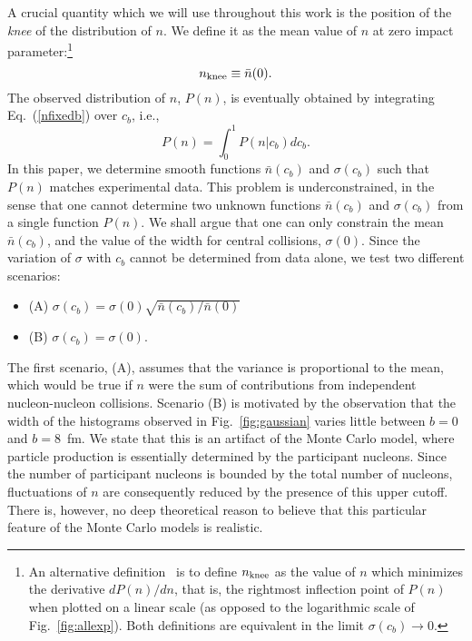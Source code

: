 \documentclass[aps,prc,twocolumn,superscriptaddress,showpacs,floatfix,nofootinbib]{revtex4-1}
\begin{document}
A crucial quantity which we will use throughout this work is the position of the \textit{knee} of the distribution of $n$. 
We define it as the mean value of $n$ at zero impact parameter:\footnote{An alternative definition~\cite{ATLAS:2017zcm} is to define $n_{\rm knee}$ as the value of $n$ which minimizes the derivative $dP(n)/dn$, that is, the rightmost inflection point of $P(n)$ when plotted on a linear scale (as opposed to the logarithmic scale of Fig.~\ref{fig:allexp}). Both definitions are equivalent in the limit $\sigma(c_b)\to 0$.}
\begin{equation}
\label{defknee}
n_{\rm knee}\equiv \bar n(0).
\end{equation}
The observed distribution of $n$, $P(n)$, is eventually obtained by integrating Eq.~(\ref{nfixedb}) over $c_b$, i.e.,
\begin{equation}
\label{vzerodist}
P(n)=\int_0^1 P(n|c_b)dc_b. 
\end{equation}
In this paper, we determine smooth functions $\bar n(c_b)$ and $\sigma(c_b)$ such that $P(n)$ matches experimental data. 
This problem is underconstrained, in the sense that one cannot determine two unknown functions $\bar n(c_b)$ and $\sigma(c_b)$ from a single function $P(n)$. 
We shall argue that one can only constrain the mean $\bar n(c_b)$, and the value of the width for central collisions, $\sigma(0)$. 
Since the variation of $\sigma$ with $c_b$ cannot be determined from data alone, we test two different scenarios:
\begin{itemize}
\item{(A) $\sigma(c_b)=\sigma(0)\sqrt{\bar n(c_b)/\bar n(0)}$}
\item{(B) $\sigma(c_b)=\sigma(0)$.}
\end{itemize}
The first scenario, (A), assumes that the variance is proportional to the mean, which would be true if $n$ were the sum of contributions from independent nucleon-nucleon collisions. 
Scenario (B) is motivated by the observation that the width of the histograms observed in Fig.~\ref{fig:gaussian} varies little between $b=0$ and $b=8$~fm. 
We state that this is an artifact of the Monte Carlo model, where particle production is essentially determined by the participant nucleons. 
Since the number of participant nucleons is bounded by the total number of nucleons, fluctuations of $n$ are consequently reduced by the presence of this upper cutoff.
There is, however, no deep theoretical reason to believe that this particular feature of the Monte Carlo models is realistic. 
\end{document}
